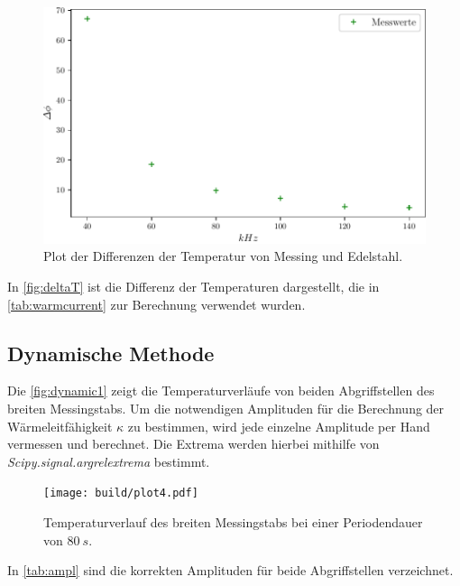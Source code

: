 \begin{figure}
    \centering
    \includegraphics[scale=0.7]{build/plot3.pdf}
    \caption{Plot der Differenzen der Temperatur von Messing und Edelstahl.}
    \label{fig:deltaT}
\end{figure}
In \autoref{fig:deltaT} ist die Differenz der Temperaturen dargestellt, die in \autoref{tab:warmcurrent} zur Berechnung verwendet wurden.

\newpage
\subsection{Dynamische Methode}
Die \autoref{fig:dynamic1} zeigt die Temperaturverläufe von beiden Abgriffstellen des breiten Messingstabs.
Um die notwendigen Amplituden für die Berechnung der Wärmeleitfähigkeit $\kappa$ zu bestimmen, wird jede einzelne Amplitude per Hand vermessen und berechnet.
Die Extrema werden hierbei mithilfe von \textit{Scipy.signal.argrelextrema} bestimmt.

\begin{figure}[htbp]
    \centering
    \texttt{[image: build/plot4.pdf]}
    \caption{Temperaturverlauf des breiten Messingstabs bei einer Periodendauer von $80\ s$.}
    \label{fig:dynamic1}
\end{figure}

In \autoref{tab:ampl} sind die korrekten Amplituden für beide Abgriffstellen verzeichnet.

